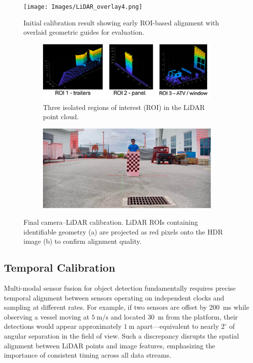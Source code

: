 \documentclass{erauthesis}
\begin{document}
\begin{figure}[ht]
    \centering
    \texttt{[image: Images/LiDAR\_overlay4.png]}
    \caption{Initial calibration result showing early ROI-based alignment with overlaid geometric guides for evaluation.}
    \label{fig:LiDAR_overlay4}
\end{figure}
\begin{figure}[htp]
\begin{subfigure}{\textwidth}
\centering
\includegraphics[width=0.94\linewidth]{Images/LiDAR_overlay3A.png}
    \caption{Three isolated regions of interest (ROI) in the LiDAR point cloud.}
    \label{fig:LiDAR_overlay3A}
\end{subfigure}
\bigskip
\begin{subfigure}{\textwidth}
\centering
\includegraphics[width=0.94\linewidth]{Images/LiDAR_overlay3B.png}
    \caption{}
    \label{fig:LiDAR_overlay3B.png}
\end{subfigure}
\caption{Final camera–LiDAR calibration. LiDAR ROIs containing identifiable geometry (a) are projected as red pixels onto the HDR image (b) to confirm alignment quality.}
\label{HDR_calib_final}
\end{figure}
\subsection{Temporal Calibration}
\label{time_sync}

Multi-modal sensor fusion for object detection fundamentally requires precise temporal alignment between sensors operating on independent clocks and sampling at different rates.  
For example, if two sensors are offset by 200~ms while observing a vessel moving at $5~\mathrm{m/s}$ and located 30~m from the platform, their detections would appear approximately $1~\mathrm{m}$ apart—equivalent to nearly $2^{\circ}$ of angular separation in the field of view.  
Such a discrepancy disrupts the spatial alignment between LiDAR points and image features, emphasizing the importance of consistent timing across all data streams.
\end{document}
